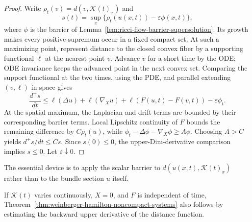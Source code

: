 \begin{proof}
Write $\rho_t(v)=d(v,\mathcal K(t)_x)$ and
\[
s(t)=\sup_x\{\rho_t(u(x,t))-\varepsilon\phi(x,t)\},
\]
where $\phi$ is the barrier of
Lemma~\ref{lem:ricci-flow-barrier-supersolution}.  Its growth makes every
positive supremum occur in a fixed compact set.  At such a maximizing point,
represent distance to the closed convex fiber by a supporting functional
$\ell$ at the nearest point $v$.  Advance $v$ for a short time by the ODE;
ODE invariance keeps the advanced point in the next convex set.  Comparing
the support functional at the two times, using the PDE, and parallel
extending $(v,\ell)$ in space gives
\[
\frac{d^+s}{dt}\leq
\ell(\Delta u)+\ell(\nabla_Xu)+
\ell(F(u,t)-F(v,t))-\varepsilon\phi_t.
\]
At the spatial maximum, the Laplacian and drift terms are bounded by their
corresponding barrier terms.  Local Lipschitz continuity of $F$ bounds the
remaining difference by $C\rho_t(u)$, while
$\phi_t-\Delta\phi-\nabla_X\phi\geq A\phi$.  Choosing $A>C$ yields
$d^+s/dt\leq Cs$.  Since $s(0)\leq0$, the upper-Dini-derivative comparison
implies $s\leq0$.  Let $\varepsilon\downarrow0$.
\end{proof}

\begin{remark}
\label{rem:barrier-applied-to-distance-from-convex-set}
The essential device is to apply the scalar barrier to
$d(u(x,t),\mathcal K(t)_x)$ rather than to the bundle section $u$ itself.
\end{remark}

\begin{example}
\label{ex:backward-time-convex-set-maximum-principle}
If $\mathcal K(t)$ varies continuously, $X=0$, and $F$ is independent of time,
Theorem~\ref{thm:weinberger-hamilton-noncompact-systems} also follows by
estimating the backward upper derivative of the distance function.
\end{example}


